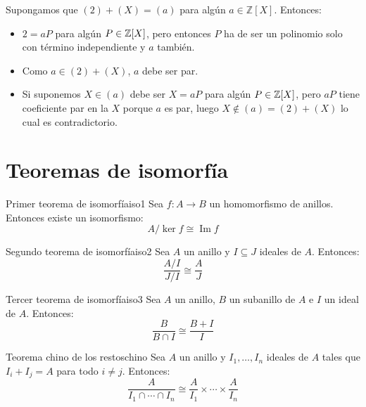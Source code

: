 \begin{proofbox}
    Supongamos que \((2) + (X) = (a)\) para algún \(a \in \mathbb{Z}[X]\). Entonces:
    \begin{itemize}
        \item \(2 = aP\) para algún \(P \in \mathbb{Z}[X]\), pero entonces $P$ ha de ser un polinomio solo con término independiente y \(a\) también.
        \item Como $a \in (2) + (X)$, $a$ debe ser par. 
        \item Si suponemos \(X \in (a)\) debe ser $X = aP$ para algún \(P \in \mathbb{Z}[X]\), pero $aP$ tiene coeficiente par en la $X$ porque $a$ es par, luego $X \notin (a) = (2) + (X)$ lo cual es contradictorio.
    \end{itemize}
\end{proofbox}

\clearpage
\section{Teoremas de isomorfía}

\begin{theorem}{Primer teorema de isomorfía}{iso1}
    Sea \(f: A \to B\) un homomorfismo de anillos. Entonces existe un isomorfismo:
    \[
    A/\ker f \cong \operatorname{Im} f
    \]
\end{theorem}

\begin{theorem}{Segundo teorema de isomorfía}{iso2}
    Sea \(A\) un anillo y \(I \subseteq J\) ideales de \(A\). Entonces:
    \[
    \frac{A/I}{J/I} \cong \frac{A}{J}
    \]
\end{theorem}

\begin{theorem}{Tercer teorema de isomorfía}{iso3}
    Sea \(A\) un anillo, \(B\) un subanillo de \(A\) e \(I\) un ideal de \(A\). Entonces:
    \[
    \frac{B}{B \cap I} \cong \frac{B + I}{I}
    \]
\end{theorem}

\begin{theorem}{Teorema chino de los restos}{chino}
    Sea \(A\) un anillo y \(I_1, \ldots, I_n\) ideales de \(A\) tales que \(I_i + I_j = A\) para todo \(i \neq j\). Entonces:
    \[
    \frac{A}{I_1 \cap \cdots \cap I_n} \cong \frac{A}{I_1} \times \cdots \times \frac{A}{I_n}
    \]
\end{theorem}